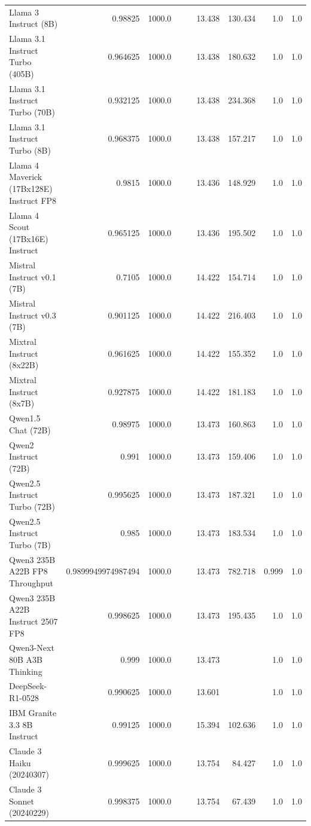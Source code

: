 \begin{table}[htp]
{\begin{tabular}{lrrrrrrrr}
Llama 3 Instruct (8B) & 0.98825 & 1000.0 &  &  & 13.438 & 130.434 & 1.0 & 1.0 \\
Llama 3.1 Instruct Turbo (405B) & 0.964625 & 1000.0 &  &  & 13.438 & 180.632 & 1.0 & 1.0 \\
Llama 3.1 Instruct Turbo (70B) & 0.932125 & 1000.0 &  &  & 13.438 & 234.368 & 1.0 & 1.0 \\
Llama 3.1 Instruct Turbo (8B) & 0.968375 & 1000.0 &  &  & 13.438 & 157.217 & 1.0 & 1.0 \\
Llama 4 Maverick (17Bx128E) Instruct FP8 & 0.9815 & 1000.0 &  &  & 13.436 & 148.929 & 1.0 & 1.0 \\
Llama 4 Scout (17Bx16E) Instruct & 0.965125 & 1000.0 &  &  & 13.436 & 195.502 & 1.0 & 1.0 \\
Mistral Instruct v0.1 (7B) & 0.7105 & 1000.0 &  &  & 14.422 & 154.714 & 1.0 & 1.0 \\
Mistral Instruct v0.3 (7B) & 0.901125 & 1000.0 &  &  & 14.422 & 216.403 & 1.0 & 1.0 \\
Mixtral Instruct (8x22B) & 0.961625 & 1000.0 &  &  & 14.422 & 155.352 & 1.0 & 1.0 \\
Mixtral Instruct (8x7B) & 0.927875 & 1000.0 &  &  & 14.422 & 181.183 & 1.0 & 1.0 \\
Qwen1.5 Chat (72B) & 0.98975 & 1000.0 &  &  & 13.473 & 160.863 & 1.0 & 1.0 \\
Qwen2 Instruct (72B) & 0.991 & 1000.0 &  &  & 13.473 & 159.406 & 1.0 & 1.0 \\
Qwen2.5 Instruct Turbo (72B) & 0.995625 & 1000.0 &  &  & 13.473 & 187.321 & 1.0 & 1.0 \\
Qwen2.5 Instruct Turbo (7B) & 0.985 & 1000.0 &  &  & 13.473 & 183.534 & 1.0 & 1.0 \\
Qwen3 235B A22B FP8 Throughput & 0.9899949974987494 & 1000.0 &  &  & 13.473 & 782.718 & 0.999 & 1.0 \\
Qwen3 235B A22B Instruct 2507 FP8 & 0.998625 & 1000.0 &  &  & 13.473 & 195.435 & 1.0 & 1.0 \\
Qwen3-Next 80B A3B Thinking & 0.999 & 1000.0 &  &  & 13.473 &  & 1.0 & 1.0 \\
DeepSeek-R1-0528 & 0.990625 & 1000.0 &  &  & 13.601 &  & 1.0 & 1.0 \\
IBM Granite 3.3 8B Instruct & 0.99125 & 1000.0 &  &  & 15.394 & 102.636 & 1.0 & 1.0 \\
Claude 3 Haiku (20240307) & 0.999625 & 1000.0 &  &  & 13.754 & 84.427 & 1.0 & 1.0 \\
Claude 3 Sonnet (20240229) & 0.998375 & 1000.0 &  &  & 13.754 & 67.439 & 1.0 & 1.0 \\

\end{tabular}}
\end{table}
